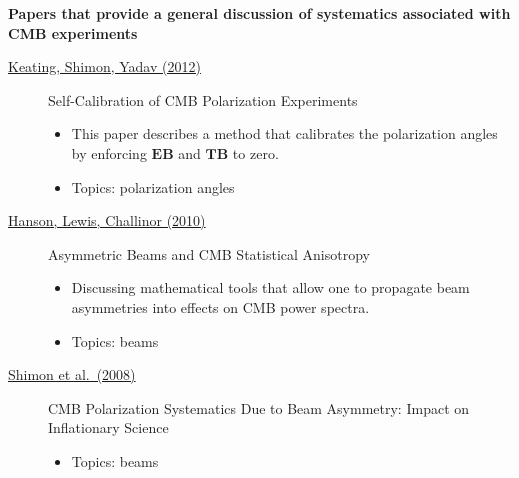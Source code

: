 \noindent \textbf{Papers that provide a general discussion of systematics associated with CMB experiments}
\begin{description}

\item[\href{https://arxiv.org/abs/1211.5734}{Keating, Shimon, Yadav (2012)}] Self-Calibration of CMB Polarization Experiments
\begin{itemize}[noitemsep]
\item This paper describes a method that calibrates the polarization angles by enforcing $\mathbf{EB}$ and $\mathbf{TB}$ to zero.
\item Topics: polarization angles
\end{itemize}

\item[\href{https://arxiv.org/abs/1003.0198}{Hanson, Lewis, Challinor (2010)}] Asymmetric Beams and CMB Statistical Anisotropy
\begin{itemize}[noitemsep]
\item Discussing mathematical tools that allow one to propagate beam asymmetries into effects on CMB power spectra.
\item Topics: beams
\end{itemize}

\item[\href{https://arxiv.org/abs/0709.1513v4}{Shimon et al.\ (2008)}] CMB Polarization Systematics Due to Beam Asymmetry: Impact on Inflationary Science
\begin{itemize}[noitemsep]
\item Topics: beams
\end{itemize}

\end{description}
